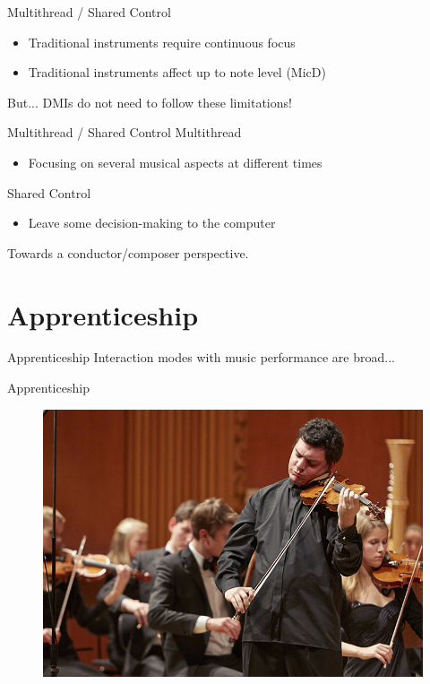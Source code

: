 \documentclass{beamer}
\begin{document}
\begin{frame}{Multithread / Shared Control}
    \begin{itemize}
        \item Traditional instruments require continuous focus
        \item Traditional instruments affect up to note level (MicD)
    \end{itemize}
    \vspace{5mm}
    But... DMIs do not need to follow these limitations!
\end{frame}

\begin{frame}{Multithread / Shared Control}
    Multithread
    \begin{itemize}
        \item Focusing on several musical aspects at different times
    \end{itemize}
    \vspace{5mm}
    Shared Control
    \begin{itemize}
        \item Leave some decision-making to the computer
    \end{itemize}
    \vspace{5mm}
    Towards a conductor/composer perspective.
\end{frame}



\section{Apprenticeship}

\begin{frame}{Apprenticeship}
    Interaction modes with music performance are broad...
\end{frame}

\begin{frame}{Apprenticeship}
    \begin{figure}[h]
        \includegraphics[width=\textwidth]{concertino.jpg}
    \end{figure}
\end{frame}
\end{document}
